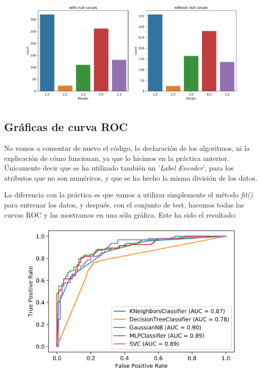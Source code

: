 \documentclass[11pt,a4paper]{article}
\begin{document}
\begin{figure}[H]
    \centering
    \includegraphics[scale=0.35]{img/margin-refill.png}
\end{figure}


\newpage
\subsection{Gráficas de curva ROC}
No vamos a comentar de nuevo el código, la declaración de los algoritmos, ni la explicación de cómo funcionan, ya que lo hicimos
en la práctica anterior. Únicamente decir que se ha utilizado también un '\textit{Label Encoder}', para los atributos que no son
numéricos, y que se ha hecho la misma división de los datos.

La diferencia con la práctica es que vamos a utilizar simplemente el método \textit{fit()} para entrenar los datos, y después,
con el conjunto de test, hacemos todas las curvas ROC y las mostramos en una sóla gráfica. Este ha sido el resultado:

\begin{figure}[H]
    \centering
    \includegraphics[scale=0.5]{img/curva-roc.png}
\end{figure}
\end{document}
